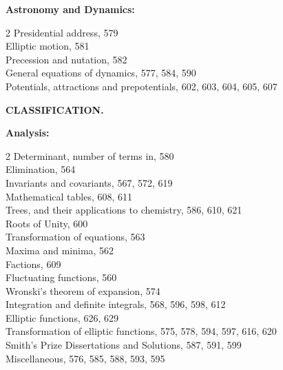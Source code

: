 \documentclass[11pt,a4paper]{book}
\begin{document}
\vspace{12pt}

\noindent \textbf{Astronomy and Dynamics:}

\begin{multicols}{2}
Presidential address, 579\\
Elliptic motion, 581\\
Precession and nutation, 582\\
General equations of dynamics, 577, 584, 590\\
Potentials, attractions and prepotentials, 602, 603, 604, 605, 607\\
\end{multicols}

\newpage
\setcounter{page}{16}

\begin{center}
{\large \textbf{CLASSIFICATION.}}
\end{center}

\vspace{12pt}

\noindent \textbf{Analysis:}

\begin{multicols}{2}
Determinant, number of terms in, 580\\
Elimination, 564\\
Invariants and covariants, 567, 572, 619\\
Mathematical tables, 608, 611\\
Trees, and their applications to chemistry, 586, 610, 621\\
Roots of Unity, 600\\
Transformation of equations, 563\\
Maxima and minima, 562\\
Factions, 609\\
Fluctuating functions, 560\\
Wronski's theorem of expansion, 574\\
Integration and definite integrals, 568, 596, 598, 612\\
Elliptic functions, 626, 629\\
Transformation of elliptic functions, 575, 578, 594, 597, 616, 620\\
Smith's Prize Dissertations and Solutions, 587, 591, 599\\
Miscellaneous, 576, 585, 588, 593, 595\\
\end{multicols}

\end{document}
